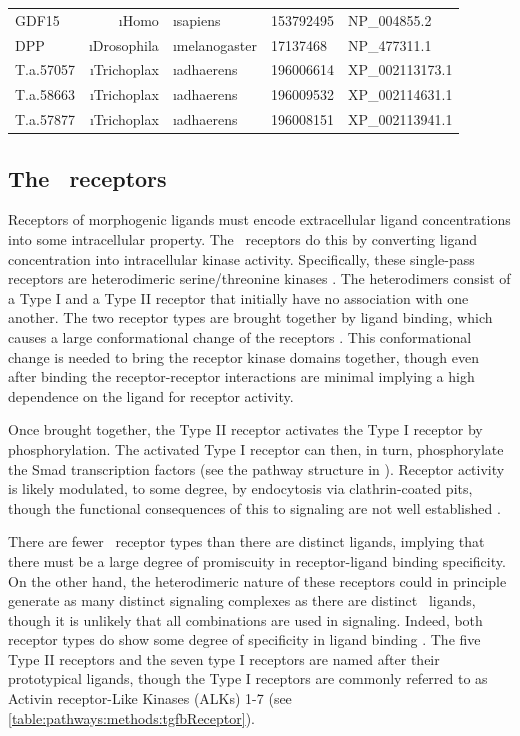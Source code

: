\begin{table}[!bt]
\begin{tabular}{lrlll}
    GDF15     & \i{Homo}       & \i{sapiens} & 153792495 & NP\_004855.2 \\
    DPP       & \i{Drosophila} & \i{melanogaster}  & 17137468  & NP\_477311.1    \\
    T.a.57057 & \i{Trichoplax} & \i{adhaerens} & 196006614 & XP\_002113173.1 \\
    T.a.58663 & \i{Trichoplax} & \i{adhaerens} & 196009532 & XP\_002114631.1 \\
    T.a.57877 & \i{Trichoplax} & \i{adhaerens} & 196008151 & XP\_002113941.1 \\
    \hline
    \end{tabular}
    \end{table}




\subsection{The \tgfbsf\ receptors}
\label{pathways:tgfb:receptors}


Receptors of morphogenic ligands must encode extracellular
ligand concentrations into some intracellular property. The \tgfbsf\ receptors
do this by converting ligand concentration into intracellular kinase activity.
Specifically, these single-pass receptors are heterodimeric
serine/threonine kinases \cite{Massague2005}.
The heterodimers consist of a Type I and a Type II
receptor that initially have no association with one another.
The two receptor types are brought together by ligand binding,
which causes a large conformational change of the receptors \cite{Hart2002}. This
conformational change is needed to bring the receptor kinase domains together,
though even after binding the receptor-receptor interactions are minimal \cite{Groppe2008}
implying a high dependence on the ligand for receptor activity.


Once brought together, the Type II receptor activates the Type I receptor by
phosphorylation. The activated Type I receptor can then, in turn, phosphorylate the
Smad transcription factors (see the pathway structure in ).
Receptor activity is likely modulated, to some degree,
by endocytosis via clathrin-coated pits,
though the functional consequences of this to signaling are not well established
\cite{Derynck2003,Massague2005,Schmierer2007,Sieber2009}.


There are fewer \tgfbsf\ receptor types than there are
distinct ligands, implying that there
must be a large degree of promiscuity in receptor-ligand
binding specificity. On the other hand, the
heterodimeric nature of these receptors could in principle
generate as many distinct signaling complexes
as there are distinct \tgfbsf\ ligands,
though it is unlikely that all combinations are used in
signaling.
Indeed, both receptor types do show some degree of specificity in ligand binding \cite{Derynck2003,Dijke2004}.
The five Type II receptors and the seven type I receptors
are named after their prototypical ligands,
though the Type I receptors are commonly referred to as Activin receptor-Like Kinases (ALKs)
1-7 (see \autoref{table:pathways:methods:tgfbReceptor}).

